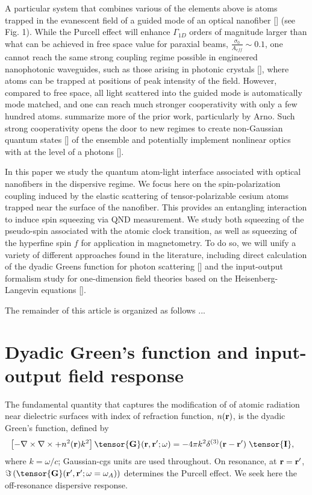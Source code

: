 \documentclass[preprint,aps,pra,onecolumn]{revtex4-1} %
\begin{document}
A particular system that combines various of the elements above is atoms trapped in the evanescent field of a guided mode of an optical nanofiber [] (see Fig. 1).  While the Purcell effect will enhance $\Gamma_{1D}$ orders of magnitude larger than what can be achieved in free space value for paraxial beams,  $\frac{\sigma_0}{A_{eff}} \sim 0.1$, one cannot reach the same strong coupling regime possible in engineered nanophotonic waveguides, such as those arising in photonic crystals [], where atoms can be trapped at positions of peak intensity of the field.  However, compared to free space, all light scattered into the guided mode is automatically mode matched, and one can reach much stronger cooperativity with only a few hundred atoms.  {\color{red}  summarize more of the prior work, particularly by Arno}.  Such strong cooperativity opens the door to new regimes to create non-Gaussian quantum states [] of the ensemble and potentially implement nonlinear optics with at the level of a photons [].

In this paper we study the quantum atom-light interface associated with optical nanofibers in the dispersive regime.  We focus here on the spin-polarization coupling induced by the elastic scattering of tensor-polarizable cesium atoms trapped near the surface of the nanofiber.  This provides an entangling interaction to induce spin squeezing via QND measurement.  We study both squeezing of the pseudo-spin associated with the atomic clock transition, as well as squeezing of the hyperfine spin $f$ for application in magnetometry.  To do so, we will unify a variety of different approaches found in the literature, including direct calculation of the dyadic Greens function for photon scattering [] and the input-output formalism study for one-dimension field theories based on the Heisenberg-Langevin equations [].

The remainder of this article is organized as follows ...

\section{Dyadic Green's function and input-output field response}
The fundamental quantity that captures the modification of of atomic radiation near dielectric surfaces with index of refraction function, $n(\mathbf{r})$, is the dyadic Green's function, defined by
 \begin{align}
\left[ -\nabla\times\nabla\times + n^2(\mbf{r}) k^2 \right] \tensor{\mathbf{G}}(\br, \br';\omega) &= -4 \pi k^2 \delta^{(3)}(\mathbf{r}-\mathbf{r}')\;\tensor{\mathbf{I}},
\end{align}
where $k=\omega/c$; Gaussian-cgs units are used throughout.  On resonance, at $\mathbf{r}=\mathbf{r}'$, $\Im\left(\tensor{\mathbf{G}}(\br', \br'; \omega= \omega_A) \right)$ determines the Purcell effect.  We seek here the off-resonance dispersive response.
\end{document}
